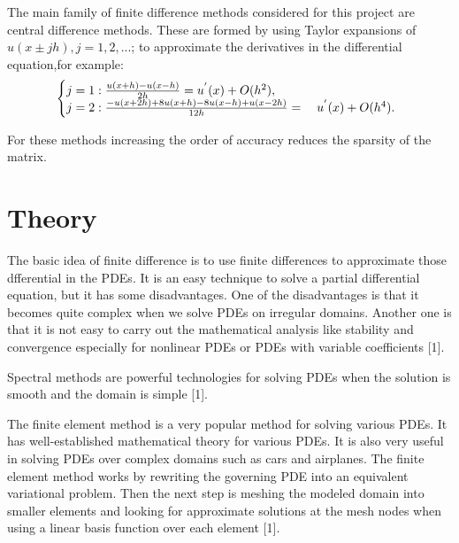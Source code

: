 \documentclass[a4paper,10pt,twoside]{article}
\begin{document}
The main family of finite difference methods considered for this project are central difference methods. These
are formed by using Taylor expansions of $ u(x\pm jh ), j= 1,2,... $; to approximate the derivatives in the differential equation,for example:
\begin{equation}
\left\{
  \begin{array}{@{}ll@{}}
    j=1:\frac { u(x+h)-u(x-h) }{ 2h } ={ u }^{ ' }(x)+O({ h }^{ 2 }) ,\\
    j=2:\frac { -u(x+2h)+8u(x+h)-8u(x-h)+u(x-2h) }{ 12h } =\quad { u }^{ ' }(x)+O({ h }^{ 4 }).
  \end{array}\right.
  \label{eq:FDM}
\end{equation}


For these methods increasing the order of accuracy
reduces the sparsity of the matrix.

\section{Theory}

The basic idea of finite difference is to use finite differences to approximate those dfferential in the PDEs. It is an easy technique to solve a partial differential equation, but it has some disadvantages. One of the disadvantages is that it becomes quite complex when we solve PDEs on irregular domains. Another one is that it is not easy to carry out the mathematical analysis like stability and convergence especially for nonlinear PDEs or PDEs with variable coefficients [1].

Spectral methods are powerful technologies for solving PDEs when the solution is smooth and the domain is simple [1]. %

The finite element method is a very popular method for solving
various PDEs. It has well-established mathematical
theory for various PDEs. It is also very useful in solving PDEs over
complex domains such as cars and airplanes. The finite element method works
by rewriting the governing PDE into an equivalent variational problem. Then the next step is meshing the modeled domain into smaller elements and looking for approximate
solutions at the mesh nodes when using a linear basis function over each element [1].
\end{document}
